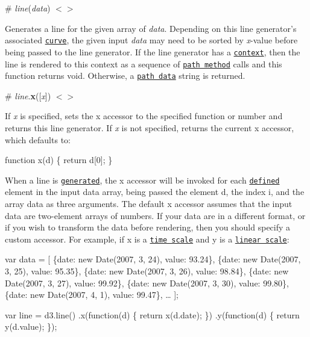 \label{__line}%
\# {\itshape line}({\itshape data}) \href{https://github.com/d3/d3-shape/blob/master/src/line.js#L14}{\tt $<$$>$}

Generates a line for the given array of {\itshape data}. Depending on this line generator’s associated \href{#line_curve}{\tt curve}, the given input {\itshape data} may need to be sorted by {\itshape x}-\/value before being passed to the line generator. If the line generator has a \href{#line_context}{\tt context}, then the line is rendered to this context as a sequence of \href{http://www.w3.org/TR/2dcontext/#canvaspathmethods}{\tt path method} calls and this function returns void. Otherwise, a \href{http://www.w3.org/TR/SVG/paths.html#PathData}{\tt path data} string is returned.

\label{_line_x}%
\# {\itshape line}.{\bfseries x}(\mbox{[}{\itshape x}\mbox{]}) \href{https://github.com/d3/d3-shape/blob/master/src/line.js#L34}{\tt $<$$>$}

If {\itshape x} is specified, sets the x accessor to the specified function or number and returns this line generator. If {\itshape x} is not specified, returns the current x accessor, which defaults to\+:


\begin{DoxyCode}
function x(d) \{
  return d[0];
\}
\end{DoxyCode}


When a line is \href{#_line}{\tt generated}, the x accessor will be invoked for each \href{#line_defined}{\tt defined} element in the input data array, being passed the element {\ttfamily d}, the index {\ttfamily i}, and the array {\ttfamily data} as three arguments. The default x accessor assumes that the input data are two-\/element arrays of numbers. If your data are in a different format, or if you wish to transform the data before rendering, then you should specify a custom accessor. For example, if {\ttfamily x} is a \href{https://github.com/d3/d3-scale#time-scales}{\tt time scale} and {\ttfamily y} is a \href{https://github.com/d3/d3-scale#linear-scales}{\tt linear scale}\+:


\begin{DoxyCode}
var data = [
  \{date: new Date(2007, 3, 24), value: 93.24\},
  \{date: new Date(2007, 3, 25), value: 95.35\},
  \{date: new Date(2007, 3, 26), value: 98.84\},
  \{date: new Date(2007, 3, 27), value: 99.92\},
  \{date: new Date(2007, 3, 30), value: 99.80\},
  \{date: new Date(2007, 4,  1), value: 99.47\},
  …
];

var line = d3.line()
    .x(function(d) \{ return x(d.date); \})
    .y(function(d) \{ return y(d.value); \});
\end{DoxyCode}



